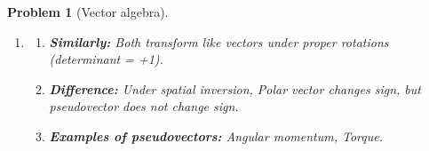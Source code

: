 \documentclass{article}
\theoremstyle{1}
\newtheorem{problem}{Problem}
\begin{document}
\begin{problem}[Vector algebra]
\begin{enumerate}[label=\arabic*.]
\begin{enumerate}
Then
\begin{equation}
P_i = \varepsilon_{ijk} A_j B_k,\quad Q_i = \varepsilon_{ilm} C_l D_m
\end{equation}
\begin{equation}
\vec{P} \cdot \vec{Q} = P_i Q_i = \varepsilon_{ijk} A_j B_k \cdot \varepsilon_{ilm} C_l D_m
\end{equation}
\begin{equation}
= \varepsilon_{ijk} \varepsilon_{ilm} A_j B_k C_l D_m
\end{equation}
Using \(\varepsilon_{ijk} \varepsilon_{ilm} = \delta_{jl}\delta_{km} - \delta_{jm}\delta_{kl}\):
\begin{equation}
= (\delta_{jl}\delta_{km} - \delta_{jm}\delta_{kl}) A_j B_k C_l D_m
\end{equation}
First term: \(\delta_{jl}\delta_{km} A_j B_k C_l D_m = A_j C_j \cdot B_k D_k = (\vec{A} \cdot \vec{C})(\vec{B} \cdot \vec{D})\).

Second term: \(-\delta_{jm}\delta_{kl} A_j B_k C_l D_m = - A_j D_j \cdot B_k C_k = -(\vec{A} \cdot \vec{D})(\vec{B} \cdot \vec{C})\).

Thus:
\begin{equation}
\boxed{(\vec{A} \times \vec{B}) \cdot (\vec{C} \times \vec{D}) = (\vec{A} \cdot \vec{C})(\vec{B} \cdot \vec{D}) - (\vec{A} \cdot \vec{D})(\vec{B} \cdot \vec{C})}
\end{equation}
    \end{enumerate}
\item \begin{enumerate}
    \item \textbf{Similarly:} Both transform like vectors under proper rotations (determinant = +1).
    \item \textbf{Difference:} Under spatial inversion, Polar vector changes sign, but pseudovector does not change sign.
    \item \textbf{Examples of pseudovectors:} Angular momentum, Torque.
\end{enumerate}
\end{enumerate}
\end{problem}
\end{document}
